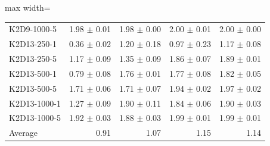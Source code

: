 \documentclass{article}
\begin{document}
\begin{table}[ht]
\begin{center}
\begin{small}
\begin{adjustbox}{max width=\columnwidth}
\begin{tabular}{l|rrrr}
K2D9-1000-5 & 1.98 $\pm$ 0.01 & 1.98 $\pm$ 0.00 & 2.00 $\pm$ 0.01 & 2.00 $\pm$ 0.00\\
K2D13-250-1 & 0.36 $\pm$ 0.02 & 1.20 $\pm$ 0.18 & 0.97 $\pm$ 0.23 & 1.17 $\pm$ 0.08\\
K2D13-250-5 & 1.17 $\pm$ 0.09 & 1.35 $\pm$ 0.09 & 1.86 $\pm$ 0.07 & 1.89 $\pm$ 0.01\\
K2D13-500-1 & 0.79 $\pm$ 0.08 & 1.76 $\pm$ 0.01 & 1.77 $\pm$ 0.08 & 1.82 $\pm$ 0.05\\
K2D13-500-5 & 1.71 $\pm$ 0.06 & 1.71 $\pm$ 0.07 & 1.94 $\pm$ 0.02 & 1.97 $\pm$ 0.02\\
K2D13-1000-1 & 1.27 $\pm$ 0.09 & 1.90 $\pm$ 0.11 & 1.84 $\pm$ 0.06 & 1.90 $\pm$ 0.03\\
K2D13-1000-5 & 1.92 $\pm$ 0.03 & 1.88 $\pm$ 0.03 & 1.99 $\pm$ 0.01 & 1.99 $\pm$ 0.01\\
\midrule
Average & 0.91 & 1.07 & 1.15 & 1.14\\
\end{tabular}
        \end{adjustbox}
    \end{small}
    \end{center}
    \vskip -0.1in
\end{table}
\FloatBarrier
\end{document}
